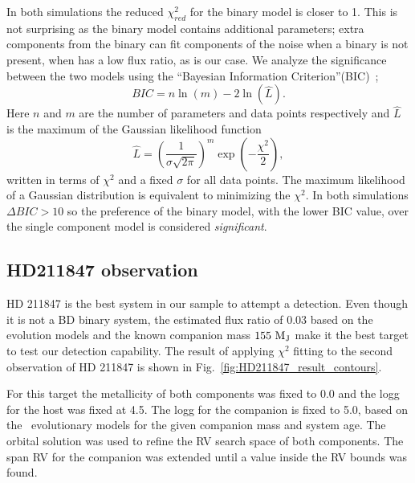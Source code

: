 \documentclass[fleqn,usenatbib]{mnras}
\newcommand*\bl{\color{blue}}
\begin{document}
    In both simulations the reduced \(\chi^2_{red}\) for the binary model is closer to 1. This is not surprising as the binary model contains {\bl additional parameters; extra components from the binary can fit components of the noise when a binary is not present, when has a low flux ratio, as is our case.}
    {We {\bl analyze} the significance between the two models using the ``Bayesian Information Criterion''(BIC)~\citep{schwarz_estimating_1978}; }
    \begin{equation}
    BIC = n\ln{(m)} - 2\ln{(\hat{L})}.
    \end{equation}
    {Here $n$ and $m$ are the number of parameters and data points respectively and \(\hat{L}\) is the maximum of the Gaussian {\bl likelihood} function }
    \begin{equation}
    \hat{L} = \left(\frac{1}{\sigma \sqrt{2\pi}}\right)^m \exp{\left(-\frac{\chi^2}{2}\right)},
    \end{equation}
    {written in terms of \(\chi^2\) and a fixed $\sigma$ for all data points. The maximum {\bl likelihood} of a Gaussian distribution is equivalent to minimizing the \(\chi^2\). In both simulations \(\Delta BIC >10\) so the preference of the binary model, with the lower BIC value, over the single component model is considered \emph{significant}.}
    
    \subsection{HD211847 observation}
    \label{subsection:results-hd211847}
    {HD 211847} is the best system in our sample to attempt a detection. {\bl Even though it is not a BD binary system, the estimated flux ratio of 0.03 based on the~\citet{baraffe_new_2015} evolution models and the known companion mass \(\rm 155~M_J\) \citet{moutou_eccentricity_2017} make it the best target to test our detection capability}. The result of applying \(\chi^2\) fitting to the second observation of {HD 211847} is shown in Fig.~\ref{fig:HD211847_result_contours}.
    
    For this target the metallicity of both components was fixed to 0.0 and the logg for the host was fixed at 4.5. The logg for the companion is fixed to 5.0, based on the~\citet{baraffe_new_2015} evolutionary models for the given companion mass and system age. The orbital solution was used to refine the RV search space of both components. The span RV for the companion was extended until a value inside the RV bounds was found.
    
\end{document}
